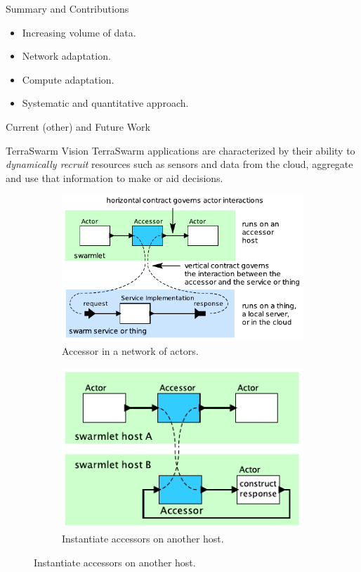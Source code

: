 \begin{frame}{Summary and Contributions}
  \begin{itemize}
  \item Increasing volume of data.
  \item Network adaptation.
  \item Compute adaptation.
  \item Systematic and quantitative approach.
  \end{itemize}
\end{frame}

\begin{frame}{Current (other) and Future Work}
  \vspace{1em}
  \begin{block}{TerraSwarm Vision}
    TerraSwarm applications are characterized by their ability to
    \textit{dynamically recruit} resources such as sensors and data from the
    cloud, aggregate and use that information to make or aid decisions.
  \end{block}

  \pause
  
  \begin{figure}
    \begin{subfigure}{0.49\textwidth}
      \centering
      \includegraphics[height=0.4\textheight]{figures/accessors.pdf}
      \caption{Accessor in a network of actors.}
    \end{subfigure}
    \hfill
    \begin{subfigure}{0.49\textwidth}
      \centering
      \includegraphics[height=0.4\textheight]{figures/accessors2.pdf}
      \caption{Instantiate accessors on another host.}
    \end{subfigure}
  \end{figure}


\end{frame}
